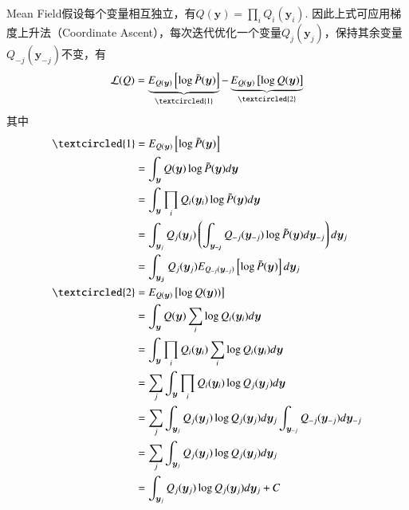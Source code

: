 Mean Field假设每个变量相互独立，有$Q(\boldsymbol{y})=\prod_i{Q_i(\boldsymbol{y}_i)}$. 因此上式可应用梯度上升法（Coordinate Ascent），每次迭代优化一个变量$Q_j(\boldsymbol{y}_j)$，保持其余变量$Q_{-j}(\boldsymbol{y}_{-j})$不变，有
\begin{equation}
    \mathcal{L}(Q)=\underbrace{E_{Q(\boldsymbol{y})}\left[\log \tilde{P}(\boldsymbol{y})\right]}_{\textcircled{1}}-\underbrace{E_{Q(\boldsymbol{y})}\left[\log Q(\boldsymbol{y})\right]}_{\textcircled{2}}
\end{equation}
其中
\begin{equation}
    \begin{split}
        \textcircled{1}&=E_{Q(\boldsymbol{y})}\left[\log \tilde{ P}(\boldsymbol{y})\right]\\
        &=\int_{\boldsymbol{y}}Q(\boldsymbol{y}) \log \tilde{P}(\boldsymbol{y})d\boldsymbol{y}\\
        &=\int_{\boldsymbol{y}}\prod_i{Q_i(\boldsymbol{y}_i)} \log \tilde{P}(\boldsymbol{y})d\boldsymbol{y}\\
        &=\int_{\boldsymbol{y}_j}Q_j(\boldsymbol{y}_j)\left(\int_{\boldsymbol{y_{-j}}}Q_{-j}(\boldsymbol{y}_{-j})\log \tilde{ P}(\boldsymbol{y}) d\boldsymbol{y}_{-j}\right) d\boldsymbol{y}_j\\
        &=\int_{\boldsymbol{y_j}}Q_j(\boldsymbol{y}_j)E_{Q_{-j}(\boldsymbol{y}_{-j})}\left[\log \tilde{ P}(\boldsymbol{y}) \right] d\boldsymbol{y}_j\\
        \textcircled{2}&=E_{Q(\boldsymbol{y})}\left[\log Q(\boldsymbol{y}))\right]\\
        &=\int_{\boldsymbol{y}}Q(\boldsymbol{y}) \sum_i\log Q_i(\boldsymbol{y}_i) d\boldsymbol{y}\\
        &=\int_{\boldsymbol{y}}\prod_i{Q_i(\boldsymbol{y}_i)} \sum_i\log Q_i(\boldsymbol{y}_i) d\boldsymbol{y}\\
        &=\sum_j\int_{\boldsymbol{y}}\prod_i{Q_i(\boldsymbol{y}_i)}\log Q_j(\boldsymbol{y}_j) d\boldsymbol{y}\\
        &=\sum_j\int_{\boldsymbol{y}_j}Q_j(\boldsymbol{y}_j)\log Q_j(\boldsymbol{y}_j) d\boldsymbol{y}_j\int_{\boldsymbol{y}_{-j}} {Q_{-j}(\boldsymbol{y}_{-j})}d\boldsymbol{y}_{-j}\\
        &=\sum_j\int_{\boldsymbol{y}_j}Q_j(\boldsymbol{y}_j)\log Q_j(\boldsymbol{y}_j) d\boldsymbol{y}_j\\
        &=\int_{\boldsymbol{y}_j}Q_j(\boldsymbol{y}_j)\log Q_j(\boldsymbol{y}_j) d\boldsymbol{y}_j + C
    \end{split}
\end{equation}
